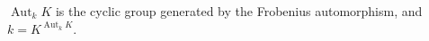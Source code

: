 $\operatorname{Aut}_k K$ is the cyclic group generated by the Frobenius automorphism, and $k = K^{\operatorname{Aut}_k K}$.
